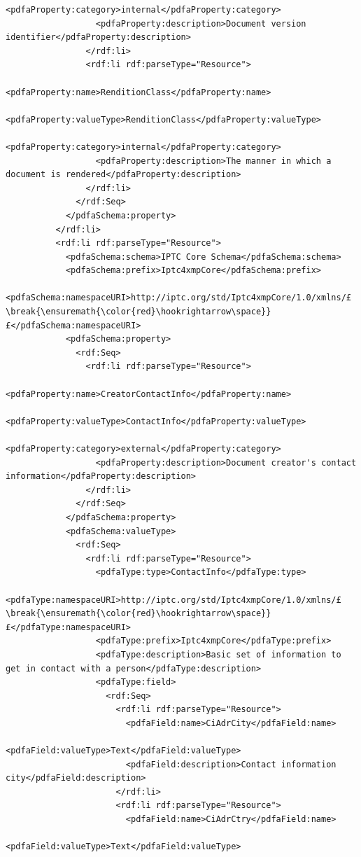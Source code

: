 \documentclass[12pt, twoside]{article}
\begin{document}
\begin{lstlisting}[style=myXML,
caption={Second part of the XML metadata embedded in a PDF file (some reformatting has been done to fit the text in the borders)}, label={lst:pdfinfoOutputPart2}]
                  <pdfaProperty:category>internal</pdfaProperty:category>
                  <pdfaProperty:description>Document version identifier</pdfaProperty:description>
                </rdf:li>
                <rdf:li rdf:parseType="Resource">
                  <pdfaProperty:name>RenditionClass</pdfaProperty:name>
                  <pdfaProperty:valueType>RenditionClass</pdfaProperty:valueType>
                  <pdfaProperty:category>internal</pdfaProperty:category>
                  <pdfaProperty:description>The manner in which a document is rendered</pdfaProperty:description>
                </rdf:li>
              </rdf:Seq>
            </pdfaSchema:property>
          </rdf:li>
          <rdf:li rdf:parseType="Resource">
            <pdfaSchema:schema>IPTC Core Schema</pdfaSchema:schema>
            <pdfaSchema:prefix>Iptc4xmpCore</pdfaSchema:prefix>
            <pdfaSchema:namespaceURI>http://iptc.org/std/Iptc4xmpCore/1.0/xmlns/£\break{\ensuremath{\color{red}\hookrightarrow\space}}£</pdfaSchema:namespaceURI>
            <pdfaSchema:property>
              <rdf:Seq>
                <rdf:li rdf:parseType="Resource">
                  <pdfaProperty:name>CreatorContactInfo</pdfaProperty:name>
                  <pdfaProperty:valueType>ContactInfo</pdfaProperty:valueType>
                  <pdfaProperty:category>external</pdfaProperty:category>
                  <pdfaProperty:description>Document creator's contact information</pdfaProperty:description>
                </rdf:li>
              </rdf:Seq>
            </pdfaSchema:property>
            <pdfaSchema:valueType>
              <rdf:Seq>
                <rdf:li rdf:parseType="Resource">
                  <pdfaType:type>ContactInfo</pdfaType:type>
                  <pdfaType:namespaceURI>http://iptc.org/std/Iptc4xmpCore/1.0/xmlns/£\break{\ensuremath{\color{red}\hookrightarrow\space}}£</pdfaType:namespaceURI>
                  <pdfaType:prefix>Iptc4xmpCore</pdfaType:prefix>
                  <pdfaType:description>Basic set of information to get in contact with a person</pdfaType:description>
                  <pdfaType:field>
                    <rdf:Seq>
                      <rdf:li rdf:parseType="Resource">
                        <pdfaField:name>CiAdrCity</pdfaField:name>
                        <pdfaField:valueType>Text</pdfaField:valueType>
                        <pdfaField:description>Contact information city</pdfaField:description>
                      </rdf:li>
                      <rdf:li rdf:parseType="Resource">
                        <pdfaField:name>CiAdrCtry</pdfaField:name>
                        <pdfaField:valueType>Text</pdfaField:valueType>

\end{lstlisting}
\end{document}
